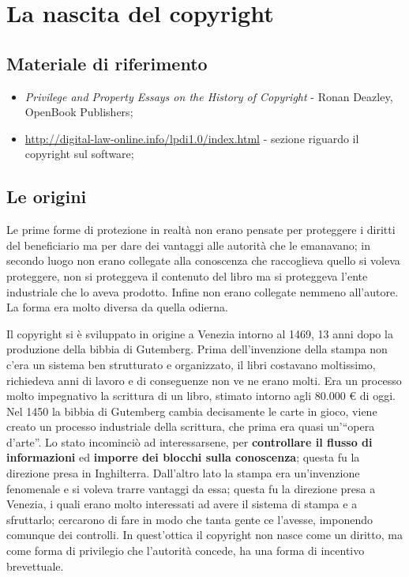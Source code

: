 \chapter{La nascita del copyright}

\section*{Materiale di riferimento}

\begin{itemize}

\item \textit{Privilege and Property Essays on the History of Copyright} - Ronan Deazley, OpenBook Publishers;
\item \url{http://digital-law-online.info/lpdi1.0/index.html} - sezione riguardo il copyright sul software;

\end{itemize}

\section{Le origini}

Le prime forme di protezione in realtà non erano pensate per proteggere i diritti del beneficiario ma per dare dei vantaggi alle autorità che le emanavano; in secondo luogo non erano collegate alla conoscenza che raccoglieva quello si voleva proteggere, non si proteggeva il contenuto del libro ma si proteggeva l'ente industriale che lo aveva prodotto. Infine non erano collegate nemmeno all'autore. La forma era molto diversa da quella odierna.

Il copyright si è sviluppato in origine a Venezia intorno al 1469, 13 anni dopo la produzione della bibbia di Gutemberg. Prima dell'invenzione della stampa non c'era un sistema ben strutturato e organizzato, il libri costavano moltissimo, richiedeva anni di lavoro e di conseguenze non ve ne erano molti. Era un processo molto impegnativo la scrittura di un libro, stimato intorno agli 80.000 \euro{} di oggi. Nel 1450 la bibbia di Gutemberg cambia decisamente le carte in gioco, viene creato un processo industriale della scrittura, che prima era quasi un'``opera d'arte''. Lo stato incominciò ad interessarsene, per \textbf{controllare il flusso di informazioni} ed \textbf{imporre dei blocchi sulla conoscenza}; questa fu la direzione presa in Inghilterra. Dall'altro lato la stampa era un'invenzione fenomenale e si voleva trarre vantaggi da essa; questa fu la direzione presa a Venezia, i quali erano molto interessati ad avere il sistema di stampa e a sfruttarlo; cercarono di fare in modo che tanta gente ce l'avesse, imponendo comunque dei controlli. In quest'ottica il copyright non nasce come un diritto, ma come forma di privilegio che l'autorità concede, ha una forma di incentivo brevettuale.

